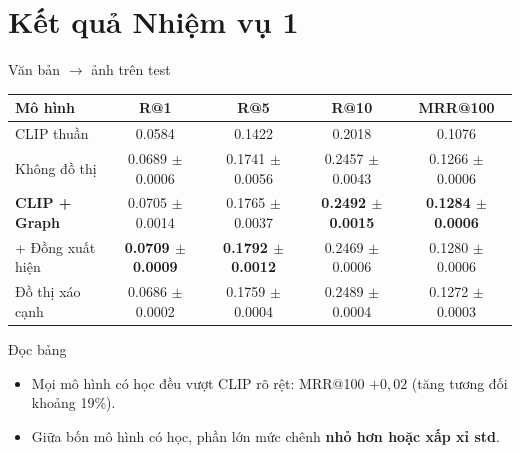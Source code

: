\documentclass[10pt, aspectratio=169]{beamer}
\makeatletter
\newcommand{\mrr}{MRR@100}
\newcommand{\pmm}{\ensuremath{\pm}}
\makeatother
\begin{document}
\section{Kết quả Nhiệm vụ 1}

\begin{frame}{Văn bản $\to$ ảnh trên test}
  \centering\small
  \begin{tabular}{l c c c c}
    \toprule
    \textbf{Mô hình} & \textbf{R@1} & \textbf{R@5} & \textbf{R@10} & \textbf{\mrr} \\
    \midrule
    CLIP thuần & 0.0584 & 0.1422 & 0.2018 & 0.1076 \\
    Không đồ thị & 0.0689 \pmm{} 0.0006 & 0.1741 \pmm{} 0.0056 & 0.2457 \pmm{} 0.0043 & 0.1266 \pmm{} 0.0006 \\
    \textbf{CLIP + Graph} & 0.0705 \pmm{} 0.0014 & 0.1765 \pmm{} 0.0037 & \textbf{0.2492 \pmm{} 0.0015} & \textbf{0.1284 \pmm{} 0.0006} \\
    + Đồng xuất hiện & \textbf{0.0709 \pmm{} 0.0009} & \textbf{0.1792 \pmm{} 0.0012} & 0.2469 \pmm{} 0.0006 & 0.1280 \pmm{} 0.0006 \\
    Đồ thị xáo cạnh & 0.0686 \pmm{} 0.0002 & 0.1759 \pmm{} 0.0004 & 0.2489 \pmm{} 0.0004 & 0.1272 \pmm{} 0.0003 \\
    \bottomrule
  \end{tabular}
  \par{}
  \vfill
  \begin{block}{Đọc bảng}
    \begin{itemize}
      \item Mọi mô hình có học đều vượt CLIP rõ rệt: \mrr{} $+0{,}02$ (tăng tương đối khoảng 19\%).
      \item Giữa bốn mô hình có học, phần lớn mức chênh \textbf{nhỏ hơn hoặc xấp xỉ std}.
    \end{itemize}
  \end{block}
\end{frame}
\end{document}
